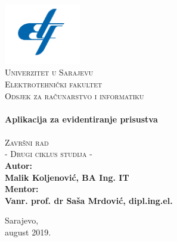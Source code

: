 \begin{titlepage}
\begin{center}


\includegraphics[width=0.25\textwidth]{material/etf-logo.png}~\\[0.1cm]
\textsc{\Large Univerzitet u Sarajevu}\\[0.2cm]  
\textsc{\Large Elektrotehnički fakultet}\\[0.2cm] 
\textsc{\Large Odsjek za računarstvo i informatiku}\\[3cm]\HRule \\[0.5cm] 
{\huge \bfseries Aplikacija za evidentiranje prisustva} \\[0.4cm] 
\HRule \\[0.5cm]

\textsc{\Large Završni rad}\\[0.4cm]
\textsc{\Large - Drugi ciklus studija - }\\[1.5cm]

\textbf{ 
\Large Autor:\\  
\Large Malik Koljenović, BA Ing. IT\\[1cm]  
\Large Mentor: \\[0.2cm] 
\Large Vanr. prof. dr Saša Mrdović, dipl.ing.el.} 
\vfill

{\large Sarajevo, \\august 2019.}

\end{center} 
\end{titlepage}